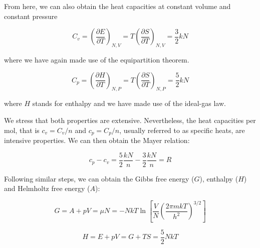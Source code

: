 \documentclass[12pt,a4paper]{report}
\newcommand{\esp}{\vspace{0.5cm}}
\begin{document}
	\esp
	
	From here, we can also obtain the heat capacities at constant volume and constant pressure
	
	\esp
	
	\begin{equation}
		C_v = \left( \frac{\partial E}{\partial T} \right)_{N,V} = T \left( \frac{\partial S}{\partial T} \right)_{N,V} = \frac{3}{2} kN
	\end{equation}
	
	\esp
	
	\noindent where we have again made use of the equipartition theorem.
	
	\esp
	
	\begin{equation}
		C_p = \left( \frac{\partial H}{\partial T} \right)_{N,P} = T \left( \frac{\partial S}{\partial T} \right)_{N,P} = \frac{5}{2} kN
	\end{equation}
	
	\esp
	
	\noindent where $H$ stands for enthalpy and we have made use of the ideal-gas law.
	
	\esp
	
	\noindent We stress that both properties are extensive. Nevertheless, the heat capacities per mol, that is $c_v = C_v/n$ and $c_p = C_p/n$, usually referred to as specific heats, are intensive properties. We can then obtain the Mayer relation:
	
	\esp
	
	\begin{equation}
		c_p - c_v = \frac{5}{2} \frac{kN}{n} - \frac{3}{2} \frac{kN}{n} = R
	\end{equation}
	
	\esp
	
	\noindent Following similar steps, we can obtain the Gibbs free energy ($G$), enthalpy ($H$) and Helmholtz free energy ($A$):
	
	\esp
	
	\begin{equation}
		G = A + pV = \mu N = -NkT \ln \left[ \frac{V}{N} \left( \frac{2\pi mkT}{h^2} \right)^{3/2} \right]
	\end{equation}
	
	\esp
	
	\begin{equation}
		H = E + pV = G + TS = \frac{5}{2} NkT
	\end{equation}
	
	\esp
	
\end{document}

